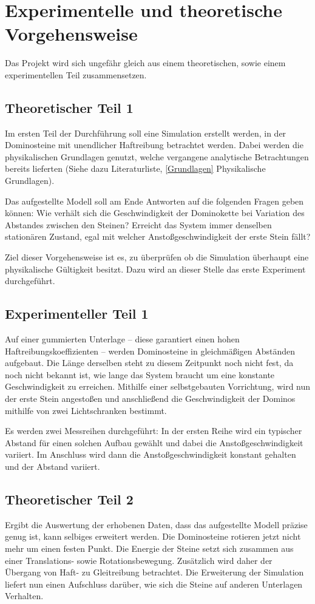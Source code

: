 \section{Experimentelle und theoretische Vorgehensweise}
Das Projekt wird sich ungefähr gleich aus einem theoretischen, sowie einem
experimentellen Teil zusammensetzen.

\subsection{Theoretischer Teil 1}
Im ersten Teil der Durchführung soll eine Simulation erstellt werden, in der
Dominosteine mit unendlicher Haftreibung betrachtet werden. Dabei werden die
physikalischen Grundlagen genutzt, welche vergangene analytische Betrachtungen
bereits lieferten (Siehe dazu Literaturliste, \ref{Grundlagen} Physikalische
Grundlagen).

Das aufgestellte Modell soll am Ende Antworten auf die folgenden Fragen geben
können:
Wie verhält sich die Geschwindigkeit der Dominokette bei Variation des Abstandes
zwischen den Steinen? Erreicht das System immer denselben stationären Zustand,
egal mit welcher Anstoßgeschwindigkeit der erste Stein fällt?

Ziel dieser Vorgehensweise ist es, zu überprüfen ob die Simulation überhaupt
eine physikalische Gültigkeit besitzt. Dazu wird an dieser Stelle das erste
Experiment durchgeführt.

\subsection{Experimenteller Teil 1}
Auf einer gummierten Unterlage – diese garantiert einen hohen
Haftreibungskoeffizienten – werden Dominosteine in gleichmäßigen Abständen
aufgebaut. Die Länge derselben steht zu diesem Zeitpunkt noch nicht fest, da
noch nicht bekannt ist, wie lange das System braucht um eine konstante
Geschwindigkeit zu erreichen.
Mithilfe einer selbstgebauten Vorrichtung, wird nun der erste Stein angestoßen
und anschließend die Geschwindigkeit der Dominos mithilfe von zwei
Lichtschranken bestimmt.

Es werden zwei Messreihen durchgeführt:
In der ersten Reihe wird ein typischer Abstand für einen solchen Aufbau
gewählt und dabei die Anstoßgeschwindigkeit variiert. Im Anschluss wird dann
die Anstoßgeschwindigkeit konstant gehalten und der Abstand variiert.

\subsection{Theoretischer Teil 2}
Ergibt die Auswertung der erhobenen Daten, dass das aufgestellte Modell präzise
genug ist, kann selbiges erweitert werden. Die Dominosteine rotieren jetzt nicht
mehr um einen festen Punkt. Die Energie der Steine setzt sich zusammen aus einer
Translations- sowie Rotationsbewegung. Zusätzlich wird daher der Übergang von
Haft- zu Gleitreibung betrachtet.
Die Erweiterung der Simulation liefert nun einen Aufschluss darüber, wie sich
die Steine auf anderen Unterlagen Verhalten.

